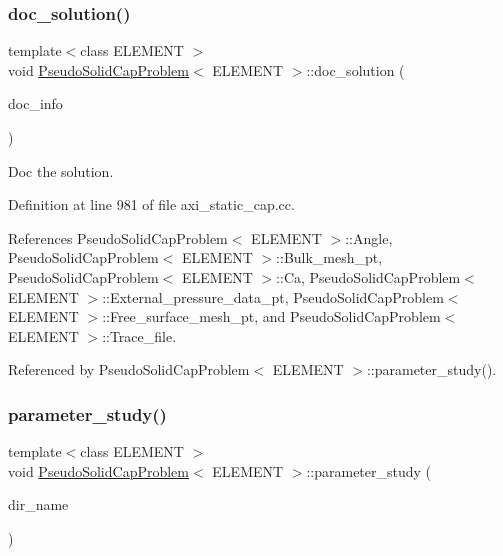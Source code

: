 \subsubsection{\texorpdfstring{doc\+\_\+solution()}{doc\_solution()}}
{\footnotesize\ttfamily template$<$class E\+L\+E\+M\+E\+NT $>$ \\
void \hyperlink{classPseudoSolidCapProblem}{Pseudo\+Solid\+Cap\+Problem}$<$ E\+L\+E\+M\+E\+NT $>$\+::doc\+\_\+solution (\begin{DoxyParamCaption}\item[{Doc\+Info \&}]{doc\+\_\+info }\end{DoxyParamCaption})}



Doc the solution. 



Definition at line 981 of file axi\+\_\+static\+\_\+cap.\+cc.



References Pseudo\+Solid\+Cap\+Problem$<$ E\+L\+E\+M\+E\+N\+T $>$\+::\+Angle, Pseudo\+Solid\+Cap\+Problem$<$ E\+L\+E\+M\+E\+N\+T $>$\+::\+Bulk\+\_\+mesh\+\_\+pt, Pseudo\+Solid\+Cap\+Problem$<$ E\+L\+E\+M\+E\+N\+T $>$\+::\+Ca, Pseudo\+Solid\+Cap\+Problem$<$ E\+L\+E\+M\+E\+N\+T $>$\+::\+External\+\_\+pressure\+\_\+data\+\_\+pt, Pseudo\+Solid\+Cap\+Problem$<$ E\+L\+E\+M\+E\+N\+T $>$\+::\+Free\+\_\+surface\+\_\+mesh\+\_\+pt, and Pseudo\+Solid\+Cap\+Problem$<$ E\+L\+E\+M\+E\+N\+T $>$\+::\+Trace\+\_\+file.



Referenced by Pseudo\+Solid\+Cap\+Problem$<$ E\+L\+E\+M\+E\+N\+T $>$\+::parameter\+\_\+study().

\mbox{\label{classPseudoSolidCapProblem_ae86ecaf62fa0920f5d14bf82a7f83b0e}} 
\subsubsection{\texorpdfstring{parameter\+\_\+study()}{parameter\_study()}}
{\footnotesize\ttfamily template$<$class E\+L\+E\+M\+E\+NT $>$ \\
void \hyperlink{classPseudoSolidCapProblem}{Pseudo\+Solid\+Cap\+Problem}$<$ E\+L\+E\+M\+E\+NT $>$\+::parameter\+\_\+study (\begin{DoxyParamCaption}\item[{const string \&}]{dir\+\_\+name }\end{DoxyParamCaption})}

